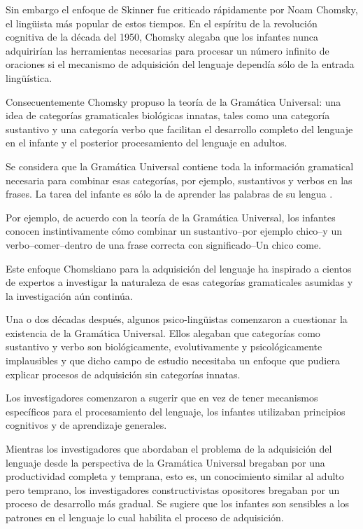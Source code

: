 Sin embargo el enfoque de Skinner fue criticado rápidamente por Noam Chomsky, el lingüista más popular de estos tiempos. 
En el espíritu de la revolución cognitiva de la década del 1950, Chomsky alegaba que los infantes nunca adquirirían las herramientas necesarias para procesar un número infinito de oraciones si el mecanismo de adquisición del lenguaje dependía sólo de la entrada lingüística.

Consecuentemente Chomsky propuso la teoría de la Gramática Universal: una idea de categorías gramaticales biológicas innatas, tales como una categoría sustantivo y una categoría verbo que facilitan el desarrollo completo del lenguaje en el infante y el posterior procesamiento del lenguaje en adultos.

Se considera que la Gramática Universal contiene toda la información gramatical necesaria para combinar esas categorías, por ejemplo, sustantivos y verbos en las frases.
La tarea del infante es sólo la de aprender las palabras de su lengua \cite{doi:10.1111/j.1460-6984.2011.00086.x}.

Por ejemplo, de acuerdo con la teoría de la Gramática Universal, los infantes conocen instintivamente cómo combinar un sustantivo--por ejemplo chico--y un verbo--comer--dentro de una frase correcta con significado--Un chico come.

Este enfoque Chomskiano \cite{10.2307/j.ctt17kk81z.1} para la adquisición del lenguaje ha inspirado a cientos de expertos a investigar la naturaleza de esas categorías gramaticales asumidas y la investigación aún continúa.

Una o dos décadas después, algunos psico-lingüistas comenzaron a cuestionar la existencia de la Gramática Universal.
Ellos alegaban que categorías como sustantivo y verbo son biológicamente, evolutivamente y psicológicamente implausibles y que dicho campo de estudio necesitaba un enfoque que pudiera explicar procesos de adquisición sin categorías innatas.

Los investigadores comenzaron a sugerir que en vez de tener mecanismos específicos para el procesamiento del lenguaje, los infantes utilizaban principios cognitivos y de aprendizaje generales. 

Mientras los investigadores que abordaban el problema de la adquisición del lenguaje desde la perspectiva de la Gramática Universal bregaban por una productividad completa y temprana, esto es, un conocimiento similar al adulto pero temprano, los investigadores constructivistas opositores bregaban por un proceso de desarrollo más gradual.
Se sugiere que los infantes son sensibles a los patrones en el lenguaje lo cual habilita el proceso de adquisición.

